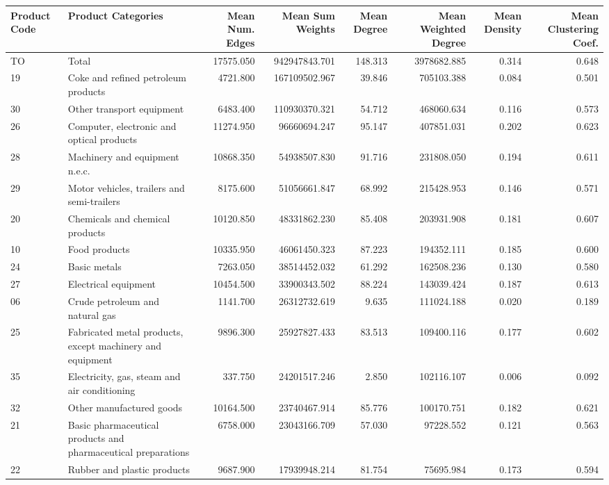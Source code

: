 \begin{tabular}{llrrrrrr}
\toprule
Product Code & Product Categories & Mean Num. Edges & Mean Sum Weights & Mean Degree & Mean Weighted Degree & Mean Density & Mean Clustering Coef. \\
\midrule
 TO & Total & 17575.050 & 942947843.701 & 148.313 & 3978682.885 & 0.314 & 0.648 \\
 19 & Coke and refined petroleum products & 4721.800 & 167109502.967 & 39.846 & 705103.388 & 0.084 & 0.501 \\
 30 & Other transport equipment & 6483.400 & 110930370.321 & 54.712 & 468060.634 & 0.116 & 0.573 \\
 26 & Computer, electronic and optical products & 11274.950 & 96660694.247 & 95.147 & 407851.031 & 0.202 & 0.623 \\
 28 & Machinery and equipment n.e.c. & 10868.350 & 54938507.830 & 91.716 & 231808.050 & 0.194 & 0.611 \\
 29 & Motor vehicles, trailers and semi-trailers & 8175.600 & 51056661.847 & 68.992 & 215428.953 & 0.146 & 0.571 \\
 20 & Chemicals and chemical products & 10120.850 & 48331862.230 & 85.408 & 203931.908 & 0.181 & 0.607 \\
 10 & Food products & 10335.950 & 46061450.323 & 87.223 & 194352.111 & 0.185 & 0.600 \\
 24 & Basic metals & 7263.050 & 38514452.032 & 61.292 & 162508.236 & 0.130 & 0.580 \\
 27 & Electrical equipment & 10454.500 & 33900343.502 & 88.224 & 143039.424 & 0.187 & 0.613 \\
 06 & Crude petroleum and natural gas & 1141.700 & 26312732.619 & 9.635 & 111024.188 & 0.020 & 0.189 \\
 25 & Fabricated metal products, except machinery and equipment & 9896.300 & 25927827.433 & 83.513 & 109400.116 & 0.177 & 0.602 \\
 35 & Electricity, gas, steam and air conditioning & 337.750 & 24201517.246 & 2.850 & 102116.107 & 0.006 & 0.092 \\
 32 & Other manufactured goods & 10164.500 & 23740467.914 & 85.776 & 100170.751 & 0.182 & 0.621 \\
 21 & Basic pharmaceutical products and pharmaceutical preparations & 6758.000 & 23043166.709 & 57.030 & 97228.552 & 0.121 & 0.563 \\
 22 & Rubber and plastic products & 9687.900 & 17939948.214 & 81.754 & 75695.984 & 0.173 & 0.594 \\

\end{tabular}

